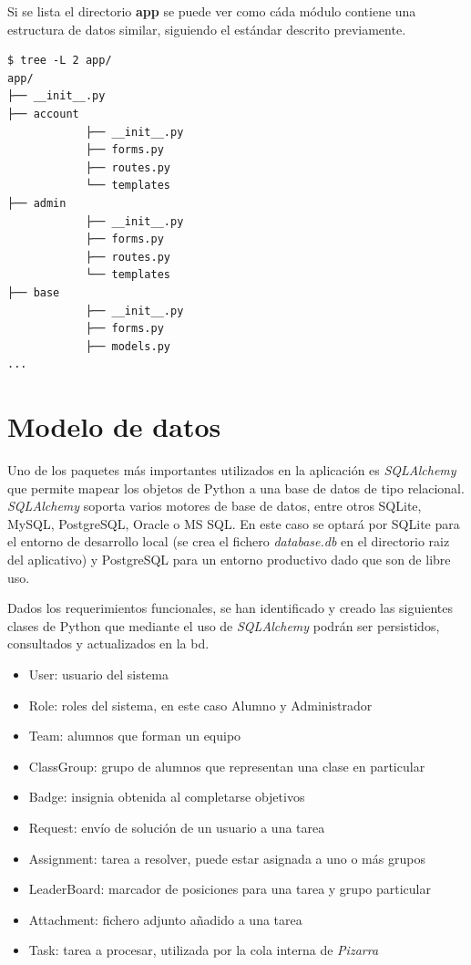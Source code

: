 \documentclass[11pt,spanish,listoffigures,listoftables]{tfgetsinf}
\begin{document}
Si se lista el directorio \textbf{app} se puede ver como cáda módulo contiene una estructura de datos similar, siguiendo el estándar descrito previamente.


\begin{lstlisting}[style=ascii-tree]
$ tree -L 2 app/
app/
├── __init__.py
├── account
			├── __init__.py
			├── forms.py
			├── routes.py
			└── templates
├── admin
			├── __init__.py
			├── forms.py
			├── routes.py
			└── templates
├── base
			├── __init__.py
			├── forms.py
			├── models.py
...
\end{lstlisting}

\section {Modelo de datos}

Uno de los \Gls{paquete}s más importantes utilizados en la aplicación es \textit{SQLAlchemy} que permite mapear los objetos de Python a una base de datos de tipo relacional. \textit{SQLAlchemy} soporta varios motores de base de datos, entre otros SQLite, MySQL, PostgreSQL, Oracle o MS SQL. En este caso se optará por SQLite para el entorno de desarrollo local (se crea el fichero \textit{database.db} en el directorio raiz del aplicativo) y PostgreSQL para un entorno productivo dado que son de libre uso.

Dados los requerimientos funcionales, se han identificado y creado las siguientes clases de Python que mediante el uso de \textit{SQLAlchemy} podrán ser persistidos, consultados y actualizados en la \acrfull{bd}.

\begin{itemize}
	\item User: usuario del sistema
	\item Role:  roles del sistema, en este caso Alumno y Administrador
	\item Team: alumnos que forman un equipo
	\item ClassGroup: grupo de alumnos que representan una clase en particular
	\item Badge: \Gls{insignia}  obtenida al completarse objetivos
	\item Request: envío de solución de un usuario a una \Gls{tarea}
	\item Assignment: \Gls{tarea} a resolver, puede estar asignada a uno o más grupos
	\item LeaderBoard: marcador de posiciones para una \Gls{tarea} y \Gls{grupo} particular
	\item Attachment: fichero adjunto añadido a una \Gls{tarea}	
	\item Task: tarea a procesar, utilizada por la \Gls{cola} interna de \textit{Pizarra}
\end{itemize}
\end{document}
